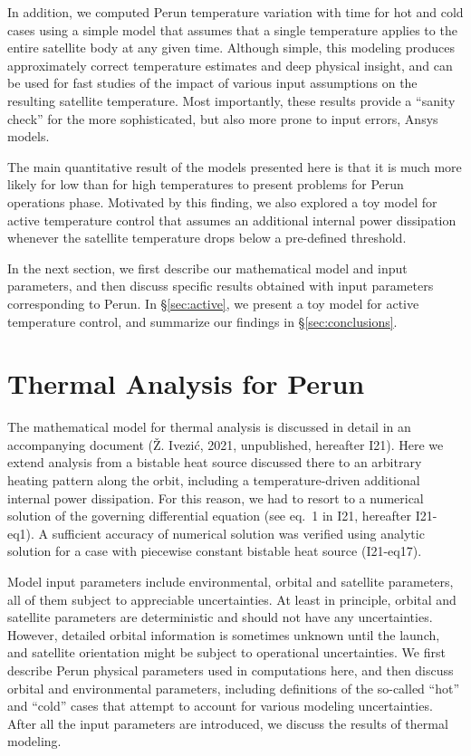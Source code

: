 \documentclass[]{aastex62}
\begin{document}
In addition, we computed Perun temperature variation with time for hot and cold cases using
a simple model that assumes that a single temperature applies to the entire satellite body 
at any given time. Although simple, this modeling produces approximately correct temperature
estimates and deep physical insight, and can be used for fast studies of the impact of various
input assumptions on the resulting satellite temperature. Most importantly, these results 
provide a ``sanity check'' for the more sophisticated, but also more prone to input errors, 
Ansys models.
 
The main quantitative result of the models presented here is that it is much more likely 
for low than for high temperatures to present problems for Perun operations phase. 
Motivated by this finding, we also explored a toy model for active temperature control that 
assumes an additional internal power dissipation whenever the satellite temperature
drops below a pre-defined threshold. 

In the next section, we first describe our mathematical model and input parameters, and then 
discuss specific results obtained with input parameters corresponding to Perun. In \S\ref{sec:active},
we present a toy model for active temperature control, and summarize our findings in \S\ref{sec:conclusions}. 



\section{Thermal Analysis for Perun} 

The mathematical model for thermal analysis is discussed in detail in an accompanying document 
(\v{Z}. Ivezi\'{c}, 2021, unpublished, hereafter I21).  Here we extend analysis from a bistable heat source
discussed there to an arbitrary heating pattern along the orbit, including a temperature-driven
additional internal power dissipation. For this reason, we had to resort to a numerical solution
of the governing differential equation (see eq.~1 in I21, hereafter I21-eq1). A sufficient accuracy of numerical 
solution was verified using analytic solution for a case with piecewise constant bistable heat source (I21-eq17). 

Model input parameters include environmental, orbital and satellite parameters, all of them
subject to appreciable uncertainties. At least in principle, orbital and satellite parameters 
are deterministic and should not have any uncertainties. However, detailed orbital information
is sometimes unknown until the launch, and satellite orientation might be subject to 
operational uncertainties. We first describe Perun physical parameters used in computations
here, and then discuss orbital and environmental parameters, including definitions of the 
so-called ``hot'' and ``cold'' cases that attempt to account for various modeling uncertainties. 
After all the input parameters are introduced, we discuss the results of thermal modeling. 
 
\end{document}
